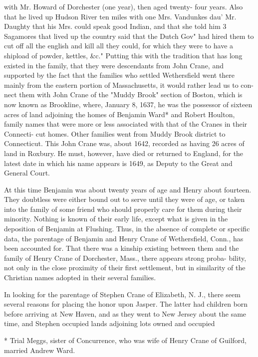 \documentclass[oneside]{book}
\begin{document}
with Mr. Howard of Dorchester (one year), then aged twenty- 
four years. Also that he lived up Hudson River ten miles 
with one Mrs. Vandunkes dau' Mr. Daughty that his Mrs. 
could speak good Indian, and that she told him 3 Sagamores that 
lived up the country said that the Dutch Gov" had hired them to 
cut off all the english and kill all they could, for which they were 
to have a shipload of powder, kettles, \&c." Putting this with 
the tradition that has long existed in the family, that they were 
descendants from John Crane, and supported by the fact that 
the families who settled Wethersfield went there mainly from the 
eastern portion of Massachusetts, it would rather lead us to con- 
nect them with John Crane of the "Muddy Brook" section of 
Boston, which is now known as Brookline, where, January 8, 1637, 
he was the possessor of sixteen acres of land adjoining the homes 
of Benjamin Ward* and Robert Houlton, family names that were 
more or less associated with that of the Cranes in their Connecti- 
cut homes. Other families went from Muddy Brook district to 
Connecticut. This John Crane was, about 1642, recorded as 
having 26 acres of land in Roxbury. He must, however, have 
died or returned to England, for the latest date in which his name 
appears is 1649, as Deputy to the Great and General Court. 

At this time Benjamin was about twenty years of age and 
Henry about fourteen. They doubtless were either bound out to 
serve until they were of age, or taken into the family of some 
friend who should properly care for them during their minority. 
Nothing is known of their early life, except what is given in the 
deposition of Benjamin at Flushing. Thus, in the absence of 
complete or specific data, the parentage of Benjamin and Henry 
Crane of Wethersfield, Conn., has been accounted for. That 
there was a kinship existing between them and the family of 
Henry Crane of Dorchester, Mass., there appears strong proba- 
bility, not only in the close proximity of their first settlement, but 
in similarity of the Christian names adopted in their several 
families. 

In looking for the parentage of Stephen Crane of Elizabeth, 
N. J., there seem several reasons for placing the honor upon 
Jasper. The latter had children born before arriving at New 
Haven, and as they went to New Jersey about the same time, 
and Stephen occupied lands adjoining lots owned and occupied 

* Trial Meggs, sister of Concurrence, who was wife of Henry Crane 
of Guilford, married Andrew Ward. 
\end{document}
